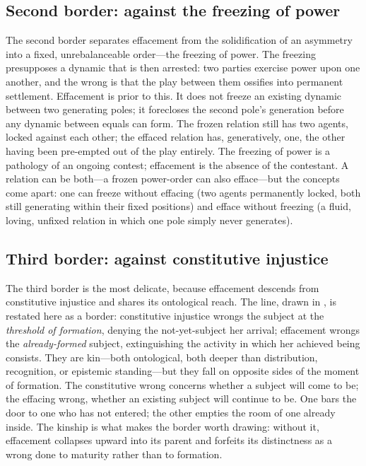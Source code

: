 \subsection{Second border: against the freezing of power}
\label{p18:sub:def-freezing}

The second border separates effacement from the solidification of an asymmetry into a fixed, unrebalanceable order---the freezing of power. The freezing presupposes a dynamic that is then arrested: two parties exercise power upon one another, and the wrong is that the play between them ossifies into permanent settlement. Effacement is prior to this. It does not freeze an existing dynamic between two generating poles; it forecloses the second pole's generation before any dynamic between equals can form. The frozen relation still has two agents, locked against each other; the effaced relation has, generatively, one, the other having been pre-empted out of the play entirely. The freezing of power is a pathology of an ongoing contest; effacement is the absence of the contestant. A relation can be both---a frozen power-order can also efface---but the concepts come apart: one can freeze without effacing (two agents permanently locked, both still generating within their fixed positions) and efface without freezing (a fluid, loving, unfixed relation in which one pole simply never generates).

\subsection{Third border: against constitutive injustice}
\label{p18:sub:def-constitutive}

The third border is the most delicate, because effacement descends from constitutive injustice and shares its ontological reach. The line, drawn in , is restated here as a border: constitutive injustice wrongs the subject at the \emph{threshold of formation}, denying the not-yet-subject her arrival; effacement wrongs the \emph{already-formed} subject, extinguishing the activity in which her achieved being consists. They are kin---both ontological, both deeper than distribution, recognition, or epistemic standing---but they fall on opposite sides of the moment of formation. The constitutive wrong concerns whether a subject will come to be; the effacing wrong, whether an existing subject will continue to be. One bars the door to one who has not entered; the other empties the room of one already inside. The kinship is what makes the border worth drawing: without it, effacement collapses upward into its parent and forfeits its distinctness as a wrong done to maturity rather than to formation.


